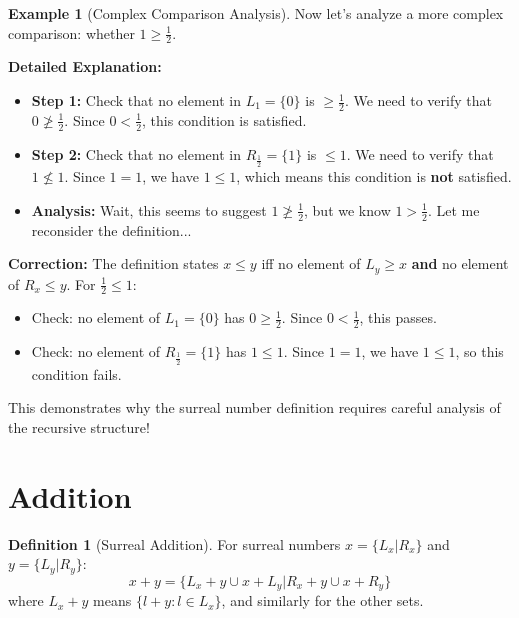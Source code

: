 \documentclass[11pt,a4paper]{article}
\theoremstyle{definition}
\newtheorem{definition}{Definition}[section]
\newtheorem{example}{Example}[section]
\begin{document}
\begin{example}[Complex Comparison Analysis]
Now let's analyze a more complex comparison: whether $1 \geq \frac{1}{2}$.


\noindent\textbf{Detailed Explanation:}
\begin{itemize}
    \item \textbf{Step 1:} Check that no element in $L_{1} = \{0\}$ is $\geq \frac{1}{2}$. We need to verify that $0 \not\geq \frac{1}{2}$. Since $0 < \frac{1}{2}$, this condition is satisfied.
    \item \textbf{Step 2:} Check that no element in $R_{\frac{1}{2}} = \{1\}$ is $\leq 1$. We need to verify that $1 \not\leq 1$. Since $1 = 1$, we have $1 \leq 1$, which means this condition is \textbf{not} satisfied.
    \item \textbf{Analysis:} Wait, this seems to suggest $1 \not\geq \frac{1}{2}$, but we know $1 > \frac{1}{2}$. Let me reconsider the definition...
\end{itemize}

\noindent\textbf{Correction:} The definition states $x \leq y$ iff no element of $L_y \geq x$ \textbf{and} no element of $R_x \leq y$. For $\frac{1}{2} \leq 1$:
\begin{itemize}
    \item Check: no element of $L_1 = \{0\}$ has $0 \geq \frac{1}{2}$. Since $0 < \frac{1}{2}$, this passes.
    \item Check: no element of $R_{\frac{1}{2}} = \{1\}$ has $1 \leq 1$. Since $1 = 1$, we have $1 \leq 1$, so this condition fails.
\end{itemize}

This demonstrates why the surreal number definition requires careful analysis of the recursive structure!
\end{example}

\section{Addition}

\begin{definition}[Surreal Addition]
For surreal numbers $x = \{L_x|R_x\}$ and $y = \{L_y|R_y\}$:
$$x + y = \{L_x + y \cup x + L_y | R_x + y \cup x + R_y\}$$
where $L_x + y$ means $\{l + y : l \in L_x\}$, and similarly for the other sets.
\end{definition}
\end{document}
